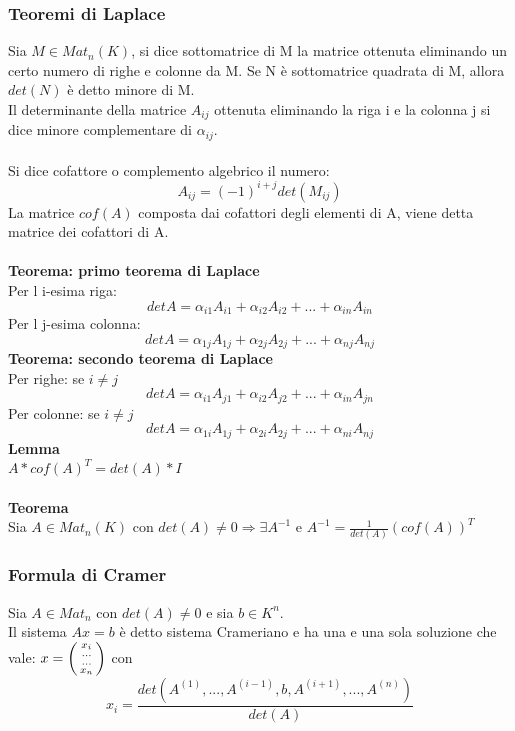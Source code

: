 \documentclass{article}
\begin{document}
\subsubsection{Teoremi di Laplace}
Sia $M\in Mat_n(K)$, si dice sottomatrice di M la matrice ottenuta eliminando un certo numero di righe e colonne da M.
Se N è sottomatrice quadrata di M, allora $det(N)$ è detto minore di M.\\
Il determinante della matrice $A_{ij}$ ottenuta eliminando la riga i e la colonna j si dice minore complementare di $\alpha_{ij}$.\\\\
Si dice cofattore o complemento algebrico il numero: $$ A_{ij}=(-1)^{i+j}det(M_{ij}) $$
La matrice $cof(A)$ composta dai cofattori degli elementi di A, viene detta matrice dei cofattori di A.\\\\
\textbf{Teorema: primo teorema di Laplace}\\
Per l i-esima riga: $$ detA=\alpha_{i1}A_{i1}+\alpha_{i2}A_{i2}+...+\alpha_{in}A_{in} $$
Per l j-esima colonna: $$ detA=\alpha_{1j}A_{1j}+\alpha_{2j}A_{2j}+...+\alpha_{nj}A_{nj} $$
\textbf{Teorema: secondo teorema di Laplace}\\
Per righe: se $i\neq j$ $$ detA=\alpha_{i1}A_{j1}+\alpha_{i2}A_{j2}+...+\alpha_{in}A_{jn} $$
Per colonne: se $i\neq j$ $$ detA=\alpha_{1i}A_{1j}+\alpha_{2i}A_{2j}+...+\alpha_{ni}A_{nj} $$
\textbf{Lemma}\\
$A*cof(A)^T=det(A)*I$\\\\
\textbf{Teorema}\\
Sia $A\in Mat_n(K)$ con $det(A)\neq0\Rightarrow\exists A^{-1}$ e $A^{-1}=\frac{1}{det(A)}(cof(A))^T$

\subsubsection{Formula di Cramer}
Sia $A\in Mat_n$ con $det(A)\neq0$ e sia $b\in K^n$.\\
Il sistema $Ax=b$ è detto sistema Crameriano e ha una e una sola soluzione che vale:
$x=\begin{psmallmatrix} x_i\\...\\...\\x_n \end{psmallmatrix}$ con
$$x_i=\frac{det(A^{(1)},...,A^{(i-1)},b,A^{(i+1)},...,A^{(n)})}{det(A)} $$
\end{document}
